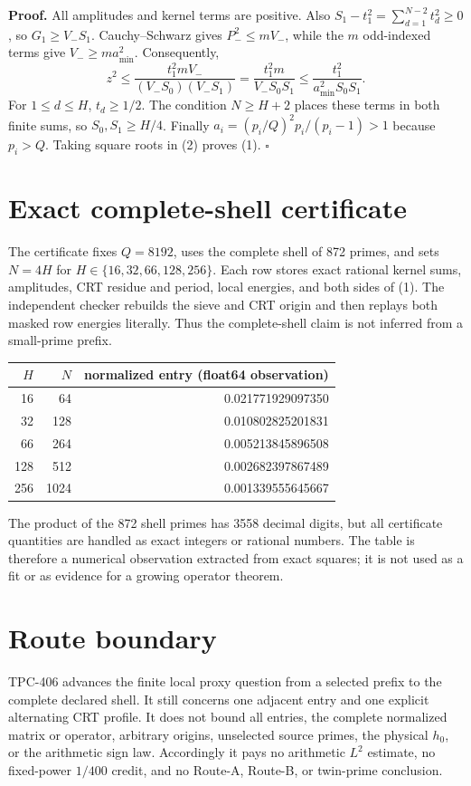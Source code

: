 \documentclass[11pt]{article}
\begin{document}
\textbf{Proof.}
All amplitudes and kernel terms are positive.  Also
$S_1-t_1^2=\sum_{d=1}^{N-2}t_d^2\geq0$, so $G_1\geq V_-S_1$.
Cauchy--Schwarz gives $P_-^2\leq mV_-$, while the $m$ odd-indexed terms
give $V_-\geq ma_{\min}^2$.  Consequently,
\[
 z^2\leq\frac{t_1^2mV_-}{(V_-S_0)(V_-S_1)}
 =\frac{t_1^2m}{V_-S_0S_1}
 \leq\frac{t_1^2}{a_{\min}^2S_0S_1}. \tag{2}
\]
For $1\leq d\leq H$, $t_d\geq1/2$.  The condition $N\geq H+2$
places these terms in both finite sums, so $S_0,S_1\geq H/4$.
Finally $a_i=(p_i/Q)^2p_i/(p_i-1)>1$ because $p_i>Q$.  Taking square
roots in (2) proves (1). \hfill$\square$

\section{Exact complete-shell certificate}
The certificate fixes $Q=8192$, uses the complete shell of 872 primes, and
sets $N=4H$ for $H\in\{16,32,66,128,256\}$.  Each row stores exact
rational kernel sums, amplitudes, CRT residue and period, local energies,
and both sides of (1).  The independent checker rebuilds the sieve and CRT
origin and then replays both masked row energies literally.  Thus the
complete-shell claim is not inferred from a small-prime prefix.

\begin{center}
\begin{tabular}{@{}rrr@{}}
\toprule
$H$ & $N$ & normalized entry (float64 observation)\\
\midrule
16  & 64   & 0.021771929097350\\
32  & 128  & 0.010802825201831\\
66  & 264  & 0.005213845896508\\
128 & 512  & 0.002682397867489\\
256 & 1024 & 0.001339555645667\\
\bottomrule
\end{tabular}
\end{center}

The product of the 872 shell primes has 3558 decimal digits, but all
certificate quantities are handled as exact integers or rational numbers.
The table is therefore a numerical observation extracted from exact squares;
it is not used as a fit or as evidence for a growing operator theorem.

\section{Route boundary}
TPC-406 advances the finite local proxy question from a selected prefix to
the complete declared shell.  It still concerns one adjacent entry and one
explicit alternating CRT profile.  It does not bound all entries, the
complete normalized matrix or operator, arbitrary origins, unselected
source primes, the physical $h_0$, or the arithmetic sign law.  Accordingly
it pays no arithmetic $L^2$ estimate, no fixed-power $1/400$ credit, and no
Route-A, Route-B, or twin-prime conclusion.
\end{document}
